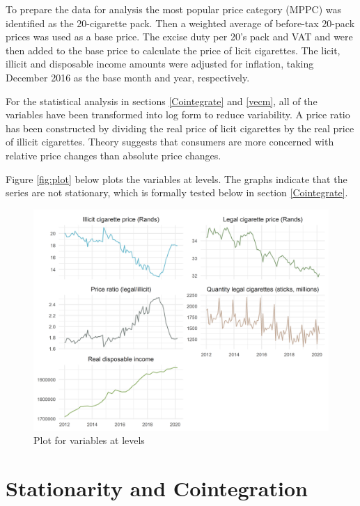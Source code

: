 \documentclass[12pt,afrikaans, english,letterpaper,oneside,
openany]{memoir}
\begin{document}
To prepare the data for analysis the most popular price category (MPPC)
was identified as the 20-cigarette pack. Then a weighted average of
before-tax 20-pack prices was used as a base price. The excise duty per
20's pack and VAT and were then added to the base price to calculate the
price of licit cigarettes. The licit, illicit and disposable income
amounts were adjusted for inflation, taking December 2016 as the base
month and year, respectively.

For the statistical analysis in sections \ref{Cointegrate} and
\ref{vecm}, all of the variables have been transformed into log form to
reduce variability. A price ratio has been constructed by dividing the
real price of licit cigarettes by the real price of illicit cigarettes.
Theory suggests that consumers are more concerned with relative price
changes than absolute price changes.

Figure \ref{fig:plot} below plots the variables at levels. The graphs
indicate that the series are not stationary, which is formally tested
below in section \ref{Cointegrate}.

\begin{figure}

{\centering \includegraphics{index_files/figure-latex/graphs-1} 

}

\caption{Plot for variables at levels \label{fig:plot}}\label{fig:graphs}
\end{figure}

\hypertarget{stationarity-and-cointegration}{%
\section{\texorpdfstring{Stationarity and Cointegration
\label{Cointegrate}}{Stationarity and Cointegration }}\label{stationarity-and-cointegration}}
\end{document}
